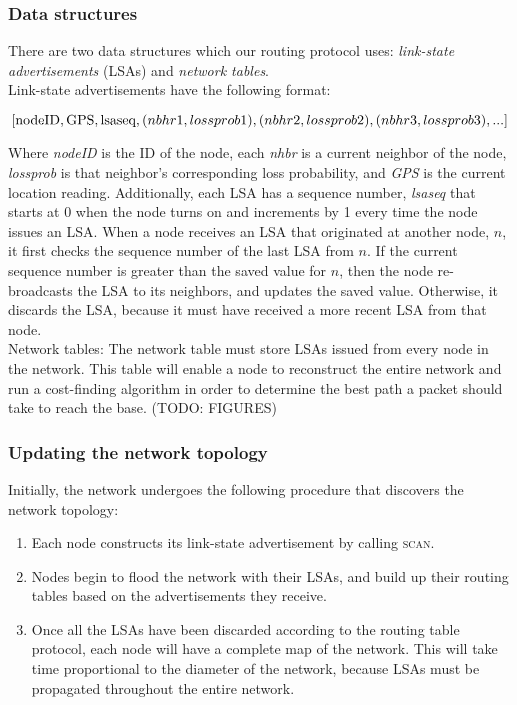 \documentclass[letterpaper]{article}
\begin{document}
\subsubsection{Data structures}

\noindent There are two data structures which our routing protocol uses: \emph{link-state advertisements} 
(LSAs) and \emph{network tables}. 
\\

\noindent Link-state advertisements have the following format:

$$ [\textnormal{nodeID}, \textnormal{GPS}, \textnormal{lsaseq}, (nbhr1, lossprob1), 
(nbhr2, lossprob2), (nbhr3, lossprob3), ...] $$

\noindent Where \emph{nodeID} is the ID of the node, each \emph{nhbr} is a current neighbor of the node,
\emph{lossprob} is that neighbor's corresponding loss probability, and \emph{GPS} is the current location
reading. Additionally, each LSA has a sequence number, \emph{lsaseq} that starts at 0 when the node turns on
and increments by 1 every time the node issues an LSA. When a node receives an LSA that originated at another
node, $n$, it first checks the sequence number of the last LSA from $n$. If the current sequence number is 
greater than the saved value for $n$, then the node re-broadcasts the LSA to its neighbors, and updates the 
saved value. Otherwise, it discards the LSA, because it must have received a more recent LSA from that node.
\\

\noindent Network tables: The network table must store LSAs issued from every node in the network. This
table will enable a node to reconstruct the entire network and run a cost-finding algorithm in order to
determine the best path a packet should take to reach the base. (TODO: FIGURES)
\\

\subsubsection{Updating the network topology}

\noindent Initially, the network undergoes the following procedure that discovers the network topology:

\begin{enumerate}
  \item Each node constructs its link-state advertisement by calling \textsc{scan}. 
  \item Nodes begin to flood the network with their LSAs, and build up their routing tables based on
  the advertisements they receive.
  \item Once all the LSAs have been discarded according to the routing table protocol, each node will have
  a complete map of the network. This will take time proportional to the diameter of the network, because
  LSAs must be propagated throughout the entire network.
\end{enumerate}
\end{document}
